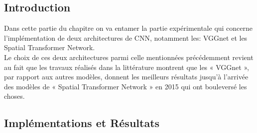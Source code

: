 \subsection{Introduction}
Dans cette partie du chapitre on va entamer la partie expérimentale qui concerne l'implémentation de deux architectures de CNN, notamment les: VGGnet et les Spatial Transformer Network.\\
Le choix de ces deux architectures parmi celle mentionnées précédemment revient au fait que les travaux réalisés dans la littérature montrent que les « VGGnet », par rapport aux autres modèles, donnent les meilleurs résultats jusqu’à l’arrivée des modèles de « Spatial Transformer Network » en 2015 qui ont bouleversé les choses.
\subsection{Implémentations et Résultats}
